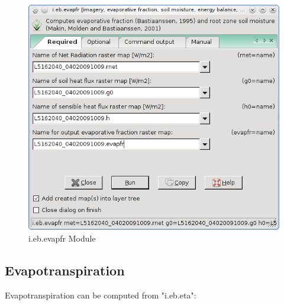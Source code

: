 \begin{figure}[htbp]
   \centering
   \includegraphics[scale=0.4]{gipe028.png}
   \caption{i.eb.evapfr Module}
   \label{fig:gipe028}
\end{figure}

\subsection{Evapotranspiration}
Evapotranspiration can be computed from "i.eb.eta":\newline

